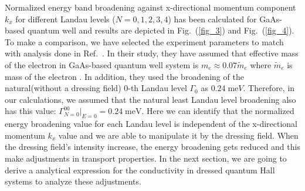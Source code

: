 Normalized energy band broadening against x-directional momentum component ${k_x}$ for different Landau levels ($N = 0,1,2,3,4$) has been calculated for GaAs-based quantum well and results are depicted in Fig.~(\ref{fig_3}) and Fig.~(\ref{fig_4}). To make a comparison, we have selected the experiment parameters to match with analysis done in Ref.~\cite{endo09}.
In their study, they have assumed that effective mass of the electron in GaAs-based quantum well system is $m_e \approx 0.07\tilde{m}_e$ where $\tilde{m}_e$ is mass of the electron \cite{endo09,winkler03,wackerl20}. In addition, they used the broadening of the natural(without a dressing field) $0$-th Landau level $\Gamma_0$ as $0.24\;\text{me}V$. Therefore, in our calculations, we assumed that the natural least Landau level broadening also has this value: $\Gamma^{00}_{N=0}|_{E=0} = 0.24 \;\text{meV}$.
Here we can identify that the normalized energy broadening value for each Landau level is independent of the x-directional momentum $k_x$ value and we are able to manipulate it by the dressing field. When the dressing field's intensity increase, the energy broadening gets reduced and this make adjustments in transport properties. In the next section, we are going to derive a analytical expression for the conductivity in dressed quantum Hall systems to analyze these adjustments.
